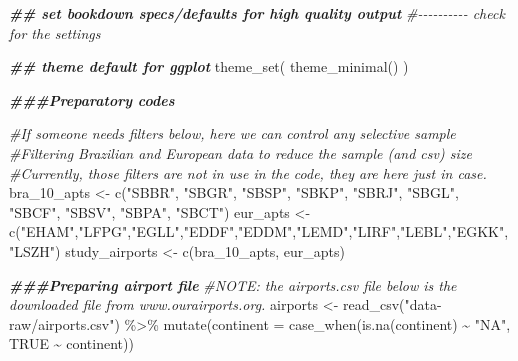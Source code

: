 \documentclass[conference,final,]{IEEEtran}
\newenvironment{Shaded}{\begin{snugshade}}{\end{snugshade}}
\newcommand{\AttributeTok}[1]{\textcolor[rgb]{0.77,0.63,0.00}{#1}}
\newcommand{\CommentTok}[1]{\textcolor[rgb]{0.56,0.35,0.01}{\textit{#1}}}
\newcommand{\ConstantTok}[1]{\textcolor[rgb]{0.00,0.00,0.00}{#1}}
\newcommand{\DocumentationTok}[1]{\textcolor[rgb]{0.56,0.35,0.01}{\textbf{\textit{#1}}}}
\newcommand{\FunctionTok}[1]{\textcolor[rgb]{0.00,0.00,0.00}{#1}}
\newcommand{\NormalTok}[1]{#1}
\newcommand{\OtherTok}[1]{\textcolor[rgb]{0.56,0.35,0.01}{#1}}
\newcommand{\SpecialCharTok}[1]{\textcolor[rgb]{0.00,0.00,0.00}{#1}}
\newcommand{\StringTok}[1]{\textcolor[rgb]{0.31,0.60,0.02}{#1}}
\begin{document}
\maketitle


%
\IEEEpeerreviewmaketitle


\begin{Shaded}
\begin{Highlighting}[]
\DocumentationTok{\#\# set bookdown specs/defaults for high quality output}
\CommentTok{\#{-}{-}{-}{-}{-}{-}{-}{-}{-}{-} check for the settings}

\DocumentationTok{\#\# theme default for ggplot}
\FunctionTok{theme\_set}\NormalTok{(}
  \FunctionTok{theme\_minimal}\NormalTok{()}
\NormalTok{  )}

\DocumentationTok{\#\#\#Preparatory codes}

\CommentTok{\#If someone needs filters below, here we can control any selective sample}
\CommentTok{\#Filtering Brazilian and European data to reduce the sample (and csv) size}
\CommentTok{\#Currently, those filters are not in use in the code, they are here just in case.}
\NormalTok{bra\_10\_apts }\OtherTok{\textless{}{-}} \FunctionTok{c}\NormalTok{(}\StringTok{"SBBR"}\NormalTok{, }\StringTok{"SBGR"}\NormalTok{, }\StringTok{"SBSP"}\NormalTok{, }\StringTok{"SBKP"}\NormalTok{, }\StringTok{"SBRJ"}\NormalTok{, }\StringTok{"SBGL"}\NormalTok{, }\StringTok{"SBCF"}\NormalTok{, }\StringTok{"SBSV"}\NormalTok{, }\StringTok{"SBPA"}\NormalTok{, }\StringTok{"SBCT"}\NormalTok{)}
\NormalTok{eur\_apts }\OtherTok{\textless{}{-}} \FunctionTok{c}\NormalTok{(}\StringTok{"EHAM"}\NormalTok{,}\StringTok{"LFPG"}\NormalTok{,}\StringTok{"EGLL"}\NormalTok{,}\StringTok{"EDDF"}\NormalTok{,}\StringTok{"EDDM"}\NormalTok{,}\StringTok{"LEMD"}\NormalTok{,}\StringTok{"LIRF"}\NormalTok{,}\StringTok{"LEBL"}\NormalTok{,}\StringTok{"EGKK"}\NormalTok{,}\StringTok{"LSZH"}\NormalTok{)}
\NormalTok{study\_airports }\OtherTok{\textless{}{-}} \FunctionTok{c}\NormalTok{(bra\_10\_apts, eur\_apts)}

\DocumentationTok{\#\#\#Preparing airport file}
\CommentTok{\#NOTE: the airports.csv file below is the downloaded file from www.ourairports.org.}
\NormalTok{airports }\OtherTok{\textless{}{-}} \FunctionTok{read\_csv}\NormalTok{(}\StringTok{"data{-}raw/airports.csv"}\NormalTok{) }\SpecialCharTok{\%\textgreater{}\%} \FunctionTok{mutate}\NormalTok{(}\AttributeTok{continent =} \FunctionTok{case\_when}\NormalTok{(}\FunctionTok{is.na}\NormalTok{(continent) }\SpecialCharTok{\textasciitilde{}} \StringTok{"NA"}\NormalTok{, }\ConstantTok{TRUE} \SpecialCharTok{\textasciitilde{}}\NormalTok{ continent))}


\end{Highlighting}
\end{Shaded}
\end{document}
